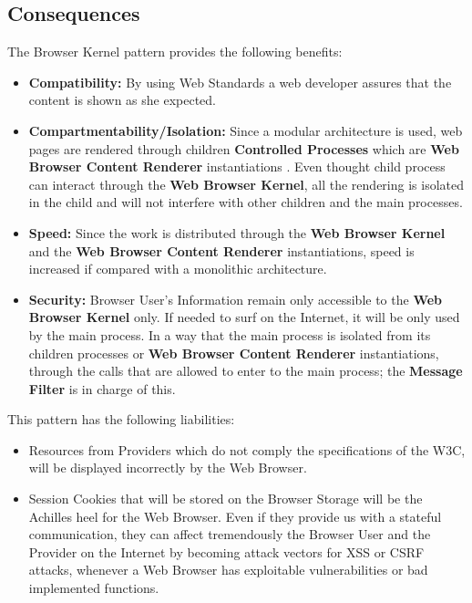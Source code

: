 \documentclass[prodmode,hillsideplop]{acmlarge}
\begin{document}
\subsection{Consequences}
The Browser Kernel pattern provides the following benefits:
\begin{itemize}
	\item \textbf{Compatibility:} By using Web Standards a web developer assures that the content is shown as she expected.
        \item \textbf{Compartmentability/Isolation:} Since a modular architecture is used, web pages are rendered through children \textbf{Controlled Processes} which are \textbf{Web Browser Content Renderer} instantiations \cite{silva2016a}. Even thought child process can interact through the \textbf{Web Browser Kernel}, all the rendering is isolated in the child and will not interfere with other children and the main processes.
    \item \textbf{Speed:} Since the work is distributed through the \textbf{Web Browser Kernel} and the \textbf{Web Browser Content Renderer} instantiations, speed is increased if compared with a monolithic architecture.
    \item \textbf{Security:} Browser User's Information remain only accessible to the \textbf{Web Browser Kernel} only. If needed to surf on the Internet, it will be only used by the main process. In a way that the main process is isolated from its children processes or \textbf{Web Browser Content Renderer} instantiations, through the calls that are allowed to enter to the main process; the \textbf{Message Filter} is in charge of this.
\end{itemize}
This pattern has the following liabilities:
\begin{itemize}
	\item Resources from Providers which do not comply the specifications of the W3C, will be displayed incorrectly by the Web Browser.
    \item Session Cookies that will be stored on the Browser Storage will be the Achilles heel for the Web Browser. Even if they provide us with a stateful communication, they can affect tremendously the Browser User and the Provider on the Internet by becoming attack vectors for XSS or CSRF attacks, whenever a Web Browser has exploitable vulnerabilities or bad implemented functions.
\end{itemize}
\end{document}
